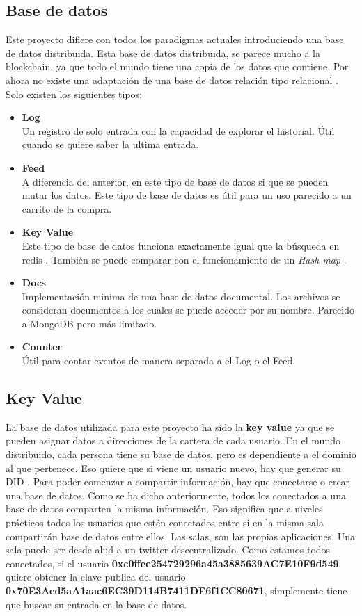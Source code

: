 \subsection{Base de datos}
Este proyecto difiere con todos los paradigmas actuales introduciendo una base de datos distribuida. Esta base de datos distribuida, se parece mucho a la blockchain, ya que todo el mundo tiene una copia de los datos que contiene.
Por ahora no existe una adaptación de una base de datos relación tipo relacional \cite{web:relational-database}. Solo existen los siguientes tipos:
\begin{itemize}
    \item \textbf{Log}\\
    Un registro de solo entrada con la capacidad de explorar el historial. Útil cuando se quiere saber la ultima entrada.
    \item \textbf{Feed}\\
    A diferencia del anterior, en este tipo de base de datos si que se pueden mutar los datos. Este tipo de base de datos es útil para un uso parecido a un carrito de la compra.
    \item \textbf{Key Value}\\
    Este tipo de base de datos funciona exactamente igual que la búsqueda en redis \cite{web:redis}. También se puede  comparar con el funcionamiento de un \textit{Hash map} \cite{web:hash-table}.
    \item \textbf{Docs} \\
    Implementación minima de una base de datos documental. Los archivos se consideran documentos a los cuales se puede acceder por su nombre. Parecido a MongoDB \cite{web:mongodb} pero más limitado.
    \item \textbf{Counter} \\
    Útil para contar eventos de manera separada a el Log o el Feed.
\end{itemize}
\subsection{Key Value}
La base de datos utilizada para este proyecto ha sido la \textbf{key value} ya que se pueden asignar datos a direcciones de la cartera de cada usuario.
En el mundo distribuido, cada persona tiene su base de datos, pero es dependiente a el dominio al que pertenece. Eso quiere que si viene un usuario nuevo, hay que generar su DID \cite{web:did}.
Para poder comenzar a compartir información, hay que conectarse o crear una base de datos. Como se ha dicho anteriormente, todos los conectados a una base de datos comparten la misma información. Eso significa que a niveles prácticos todos los usuarios que estén conectados entre si en la misma sala compartirán base de datos entre ellos.
Las salas, son las propias aplicaciones. Una sala puede ser desde alud a un twitter descentralizado.
Como estamos todos conectados, si el usuario \textbf{0xc0ffee254729296a45a3885639AC7E10F9d549} quiere obtener la clave publica del usuario \textbf{0x70E3Aed5aA1aac6EC39D114B7411DF6f1CC80671}, simplemente tiene que buscar su entrada en la base de datos.
